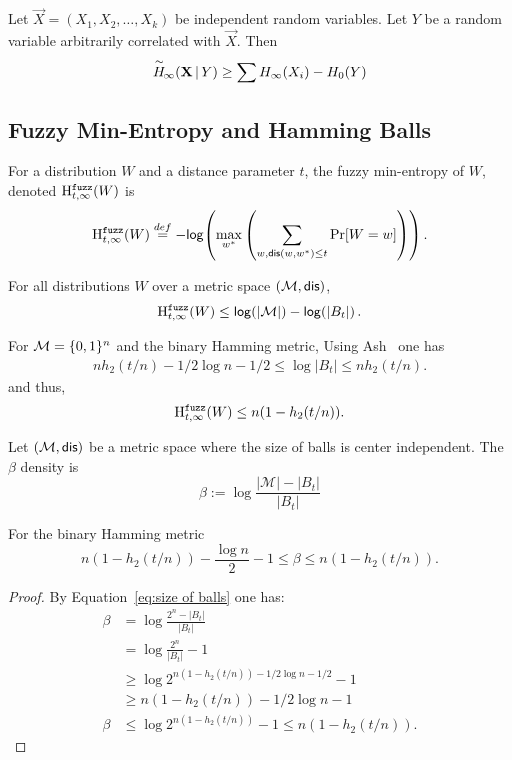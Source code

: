 \begin{lemma}
    \label{lem:conditionalminentloss}
    Let $\vec{X} = (X_1, X_2, \ldots, X_k)$ be independent random variables. 
    Let $Y$ be a random variable arbitrarily correlated with $\vec{X}$. 
    Then 
    \[
        \overset{\sim}{H}\!_{\infty}\!\left(\mathbf{X}\,|\,Y\right) \geq \sum H_{\infty}\!\left(X_i\right) - H_0\!\left(Y\right)
    \]
\end{lemma} 



\subsection{Fuzzy Min-Entropy and Hamming Balls}
\begin{definition}

For a distribution $W$ and a distance parameter $t$, the fuzzy min-entropy of $W$, denoted $\mathrm{H}^{\mathtt{fuzz}}_{t,\infty}(W)$ is 
\[
\mathrm{H}^{\mathtt{fuzz}}_{t,\infty}(W) \overset{def}= -\mathsf{log}\!\left( \max_{w^*} \left(\sum_{w, \mathsf{dis}(w, w^*)\le t} \Pr[W=w] \right)\right).
\]
\end{definition}

\begin{lemma} \label{lem:max fuzz ent}
For all distributions $W$ over a metric space $(\mathcal{M}, \mathsf{dis})$, 
\[\mathrm{H}^{\mathtt{fuzz}}_{t,\infty}(W) \le \mathsf{log}\!\left(|\mathcal{M}|\right) - \mathsf{log}\!\left(|B_t|\right).
\]
\end{lemma}
\noindent
For $\mathcal{M} = \{0, 1\}^n$ and the binary Hamming metric,
Using Ash~\cite[Lemma 4.7.2, Equation 4.7.5, p. 115]{ash2012information} one has
\begin{align} nh_2(t/n)  -1/2\log{n} - 1/2 \le \log{|B_t|} \le  nh_2(t/n)\label{eq:size of balls}.\end{align}
and thus, 
\[
\mathrm{H}^{\mathtt{fuzz}}_{t,\infty}(W) \le n(1-h_2(t/n)).
\]

\begin{definition}
Let $(\mathcal{M}, \mathsf{dis})$ be a metric space where the size of balls is center independent.  The $\beta$ density is
\[
\beta := \log{\frac{|\mathcal{M}|- |B_t|}{|B_t|}} 
\]
\end{definition}
\begin{claim} 
For the binary Hamming metric 
\[
n(1-h_2(t/n))-\frac{\log{n}}{2}-1 \le \beta \le n(1-h_2(t/n)).
\]

\end{claim}

\begin{proof}
By Equation~\ref{eq:size of balls} one has: 
\begin{align*}
\beta &= \log{\frac{2^n - |B_t|}{|B_t|}} \\&= \log{\frac{2^n}{|B_t|} -1} \\&\ge \log{2^{n(1-h_2(t/n)) - 1/2 \log{n}-1/2} -1} \\&\ge n(1-h_2(t/n)) - 1/2\log{n}-1\\
\beta&\le \log{2^{n(1-h_2(t/n))} -1} \le n(1-h_2(t/n)).
\end{align*}
\end{proof}


